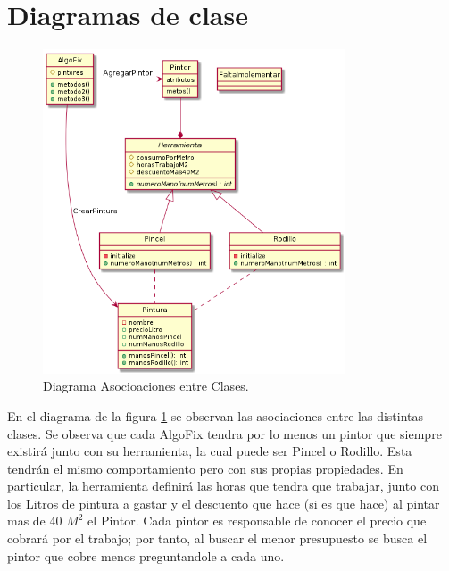 \documentclass[titlepage,a4paper]{article}
\begin{document}
\newpage
\section{Diagramas de clase}\label{sec:diagramasdeclase}



\begin{figure}[H]
  \centering
  \includegraphics[width=0.8\textwidth]{diagrama_clase01.png}
  \caption{\label{fig:class01}Diagrama Asocioaciones entre Clases.}
  \end{figure}

  En el diagrama de la figura \ref{fig:class01} se observan las asociaciones entre las distintas clases. 
  Se observa que cada AlgoFix tendra por lo menos un pintor que siempre existirá junto con su herramienta, la cual puede ser Pincel o Rodillo. Esta tendrán el mismo
  comportamiento pero con sus propias propiedades. En particular, la herramienta definirá las horas que tendra que trabajar, junto con los Litros de pintura a gastar y 
  el descuento que hace (si es que hace) al pintar mas de 40 $M^2$ el Pintor. Cada pintor es responsable de conocer el precio que cobrará por el trabajo; por tanto, 
  al buscar el menor presupuesto se busca el pintor que cobre menos preguntandole a cada uno. 
\end{document}

